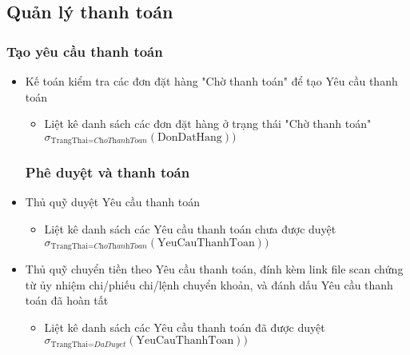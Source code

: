 \documentclass{article}
\begin{document}
	\subsection{Quản lý thanh toán}
	\subsubsection{Tạo yêu cầu thanh toán}
	\begin{itemize}
		\item Kế toán kiểm tra các đơn đặt hàng "Chờ thanh toán" để tạo Yêu cầu thanh
			toán
			\begin{itemize}
				\item Liệt kê danh sách các đơn đặt hàng ở trạng thái "Chờ thanh toán"\\
					$\sigma_{\text{TrangThai} = \textit{ChoThanhToan}}(\text{DonDatHang}))$
			\end{itemize}
			\subsubsection{Phê duyệt và thanh toán}

		\item Thủ quỹ duyệt Yêu cầu thanh toán
			\begin{itemize}
				\item Liệt kê danh sách các Yêu cầu thanh toán chưa được duyệt\\
					$\sigma_{\text{TrangThai} = \textit{ChoThanhToan}}(\text{YeuCauThanhToan}
					))$
			\end{itemize}

		\item Thủ quỹ chuyển tiền theo Yêu cầu thanh toán, đính kèm link file scan
			chứng từ ủy nhiệm chi/phiếu chi/lệnh chuyển khoản, và đánh dấu Yêu cầu thanh
			toán đã hoàn tất
			\begin{itemize}
				\item Liệt kê danh sách các Yêu cầu thanh toán đã được duyệt\\
					$\sigma_{\text{TrangThai} = \textit{DaDuyet}}(\text{YeuCauThanhToan}))$
			\end{itemize}
	\end{itemize}
\end{document}
